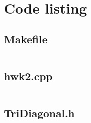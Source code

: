 \documentclass{article}
\begin{document}
\section*{Code listing}

\subsection*{Makefile}

\inputminted[fontsize=\small]{Makefile}{../cpp/Makefile}

\subsection*{hwk2.cpp}

\inputminted[fontsize=\small]{c++}{../cpp/hwk2.cpp}

\subsection*{TriDiagonal.h}

\inputminted[fontsize=\small]{c++}{../cpp/TriDiagonal.h}
\end{document}
